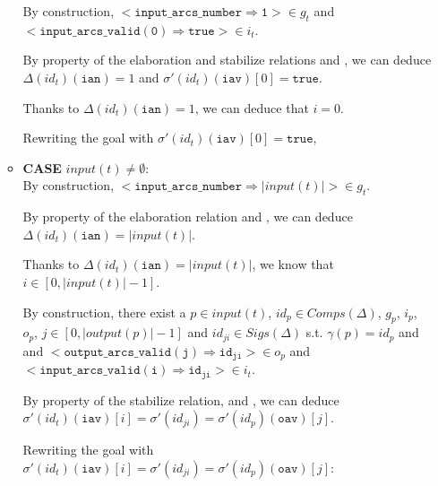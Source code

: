 \documentclass[dvipsnames,12pt]{article}
\begin{document}
\begin{niproof}
\begin{enumerate}
\begin{itemize}
      By construction,
      ${<}\mathtt{input\_arcs\_number\Rightarrow{}1}{>}\in{}g_t$ and\\
      ${<}\mathtt{input\_arcs\_valid(0)\Rightarrow{}true}{>}\in{}i_t$.

      By property of the elaboration and stabilize relations and
      \InCsCompT{}, we can deduce $\Delta(id_t)(\texttt{ian})=1$ and
      $\sigma'(id_t)(\texttt{iav})[0]=\mathtt{true}$.

      Thanks to $\Delta(id_t)(\texttt{ian})=1$, we can deduce that $i=0$.

      Rewriting the goal with $\sigma'(id_t)(\texttt{iav})[0]=\mathtt{true}$,
      
    \item \textbf{CASE} $input(t)\neq\emptyset$:\\
      \noindent{}By construction,
      ${<}\mathtt{input\_arcs\_number\Rightarrow{}}\vert{}input(t)\vert{>}\in{}g_t$.

      By property of the elaboration relation and \InCsCompT, we can
      deduce $\Delta(id_t)(\texttt{ian})=\vert{}input(t)\vert$.
      
      Thanks to $\Delta(id_t)(\texttt{ian})=\vert{}input(t)\vert$, we know
      that $i\in[0,\vert{}input(t)\vert-1]$.

      By construction, there exist a $p\in{}input(t)$,
      $id_p\in{}Comps(\Delta)$, $g_p$, $i_p$, $o_p$,
      $j\in{}[0,\vert{}output(p)\vert-1]$ and
      $id_{ji}\in{}Sigs(\Delta)$ s.t. $\gamma(p)=id_p$ and\\
      \InCsCompP{} and
      ${<}\mathtt{output\_arcs\_valid(j)\Rightarrow{}id_{ji}}{>}\in{}o_p$
      and
      ${<}\mathtt{input\_arcs\_valid(i)\Rightarrow{}id_{ji}}{>}\in{}i_t$.

      By property of the stabilize relation, \InCsCompT{} and
      \InCsCompP, we can deduce
      $\sigma'(id_t)(\texttt{iav})[i]=\sigma'(id_{ji})=\sigma'(id_p)(\texttt{oav})[j]$.

      Rewriting the goal with
      $\sigma'(id_t)(\texttt{iav})[i]=\sigma'(id_{ji})=\sigma'(id_p)(\texttt{oav})[j]$:\\


\end{itemize}
\end{enumerate}
\end{niproof}
\end{document}
